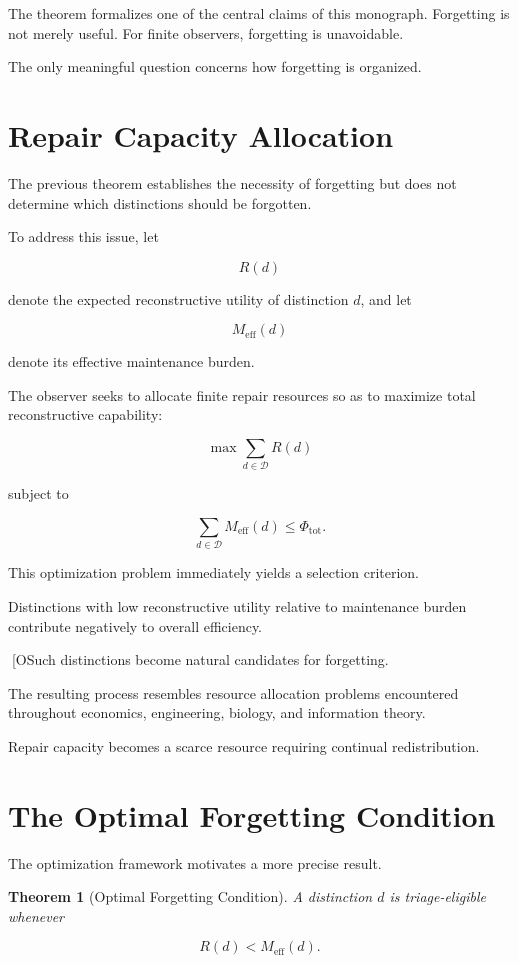 \documentclass[12pt,oneside]{book}
\theoremstyle{plain} \newtheorem{theorem}{Theorem}[chapter] \newtheorem{lemma}[theorem]{Lemma} \newtheorem{proposition}[theorem]{Proposition} \newtheorem{corollary}[theorem]{Corollary}
\theoremstyle{definition} \newtheorem{definition}[theorem]{Definition} \newtheorem{axiom}[theorem]{Axiom} \newtheorem{construction}[theorem]{Construction}
\theoremstyle{remark} \newtheorem{remark}[theorem]{Remark} \newtheorem{example}[theorem]{Example}
\newcommand{\D}{\mathcal{D}} \newcommand{\R}{\mathcal{R}} \newcommand{\F}{\mathcal{F}} \newcommand{\U}{\mathcal{U}} \newcommand{\M}{\mathcal{M}} \newcommand{\G}{\Gamma}
\begin{document}
The theorem formalizes one of the central claims of this monograph. Forgetting is not merely useful. For finite observers, forgetting is unavoidable.

The only meaningful question concerns how forgetting is organized.

\section{Repair Capacity Allocation}

The previous theorem establishes the necessity of forgetting but does not determine which distinctions should be forgotten.

To address this issue, let

\[
R(d)
\]

denote the expected reconstructive utility of distinction $d$, and let

\[
M_{\mathrm{eff}}(d)
\]

denote its effective maintenance burden.

The observer seeks to allocate finite repair resources so as to maximize total reconstructive capability:

\[
\max
\sum_{d\in\D}
R(d)
\]

subject to

\[
\sum_{d\in\D}
M_{\mathrm{eff}}(d)
\leq
\Phi_{\mathrm{tot}}.
\]

This optimization problem immediately yields a selection criterion.

Distinctions with low reconstructive utility relative to maintenance burden contribute negatively to overall efficiency.

[OSuch distinctions become natural candidates for forgetting.

The resulting process resembles resource allocation problems encountered throughout economics, engineering, biology, and information theory.

Repair capacity becomes a scarce resource requiring continual redistribution.

\section{The Optimal Forgetting Condition}

The optimization framework motivates a more precise result.

\begin{theorem}[Optimal Forgetting Condition]

A distinction $d$ is triage-eligible whenever

\[
R(d)
<
M_{\mathrm{eff}}(d).
\]

\end{theorem}
\end{document}
